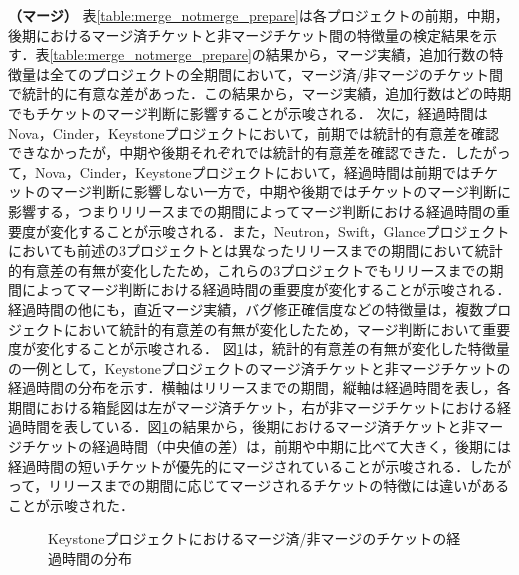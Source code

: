 \documentclass[11pt]{jreport}
\begin{document}
\textbf{（マージ）} 表\ref{table:merge_notmerge_prepare}は各プロジェクトの前期，中期，後期におけるマージ済チケットと非マージチケット間の特徴量の検定結果を示す．表\ref{table:merge_notmerge_prepare}の結果から，マージ実績，追加行数の特徴量は全てのプロジェクトの全期間において，マージ済/非マージのチケット間で統計的に有意な差があった．この結果から，マージ実績，追加行数はどの時期でもチケットのマージ判断に影響することが示唆される．
次に，経過時間はNova，Cinder，Keystoneプロジェクトにおいて，前期では統計的有意差を確認できなかったが，中期や後期それぞれでは統計的有意差を確認できた．したがって，Nova，Cinder，Keystoneプロジェクトにおいて，経過時間は前期ではチケットのマージ判断に影響しない一方で，中期や後期ではチケットのマージ判断に影響する，つまりリリースまでの期間によってマージ判断における経過時間の重要度が変化することが示唆される．また，Neutron，Swift，Glanceプロジェクトにおいても前述の3プロジェクトとは異なったリリースまでの期間において統計的有意差の有無が変化したため，これらの3プロジェクトでもリリースまでの期間によってマージ判断における経過時間の重要度が変化することが示唆される．経過時間の他にも，直近マージ実績，バグ修正確信度などの特徴量は，複数プロジェクトにおいて統計的有意差の有無が変化したため，マージ判断において重要度が変化することが示唆される．
図\ref{fig:merge_age}は，統計的有意差の有無が変化した特徴量の一例として，Keystoneプロジェクトのマージ済チケットと非マージチケットの経過時間の分布を示す．横軸はリリースまでの期間，縦軸は経過時間を表し，各期間における箱髭図は左がマージ済チケット，右が非マージチケットにおける経過時間を表している．図\ref{fig:merge_age}の結果から，後期におけるマージ済チケットと非マージチケットの経過時間（中央値の差）は，前期や中期に比べて大きく，後期には経過時間の短いチケットが優先的にマージされていることが示唆される．したがって，リリースまでの期間に応じてマージされるチケットの特徴には違いがあることが示唆された．

\begin{figure}[h]
\begin{center}
\caption{Keystoneプロジェクトにおけるマージ済/非マージのチケットの経過時間の分布}
\label{fig:merge_age}
\end{center}
\end{figure}
\end{document}
